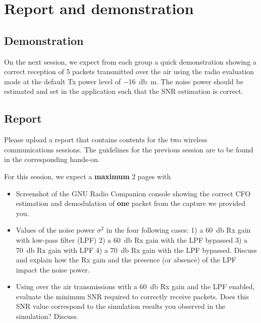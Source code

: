 \section{Report and demonstration}

\subsection{Demonstration}

On the next session, we expect from each group a quick demonstration showing a correct reception of 5 packets transmitted over the air using the radio evaluation mode
at the default Tx power level of \SI{-16}{\decibel\meter}. The noise power should be estimated and set in the application such that the SNR estimation is correct.

\subsection{Report}

Please upload a report that contains contents for the two wireless communications sessions.
The guidelines for the previous session are to be found in the corresponding hands-on.

For this session, we expect a \textbf{maximum} 2 pages with
\begin{itemize}
    \item Screenshot of the GNU Radio Companion console showing the correct CFO estimation and demodulation of \textbf{one} packet from the capture we provided you.
    \item Values of the noise power $\sigma^2$ in the four following cases:
        1) a \SI{60}{\decibel} Rx gain with low-pass filter (LPF) 2) a \SI{60}{\decibel} Rx gain with the LPF bypassed 3) a \SI{70}{\decibel} Rx gain with LPF 4) a \SI{70}{\decibel} Rx gain with the LPF bypassed.
    Discuss and explain how the Rx gain and the presence (or absence) of the LPF impact the noise power.
\item Using over the air transmissions with a \SI{60}{\decibel} Rx gain and the LPF enabled, evaluate the minimum SNR required to correctly receive packets.
    Does this SNR value correspond to the simulation results you observed in the simulation? Discuss.
\end{itemize}
